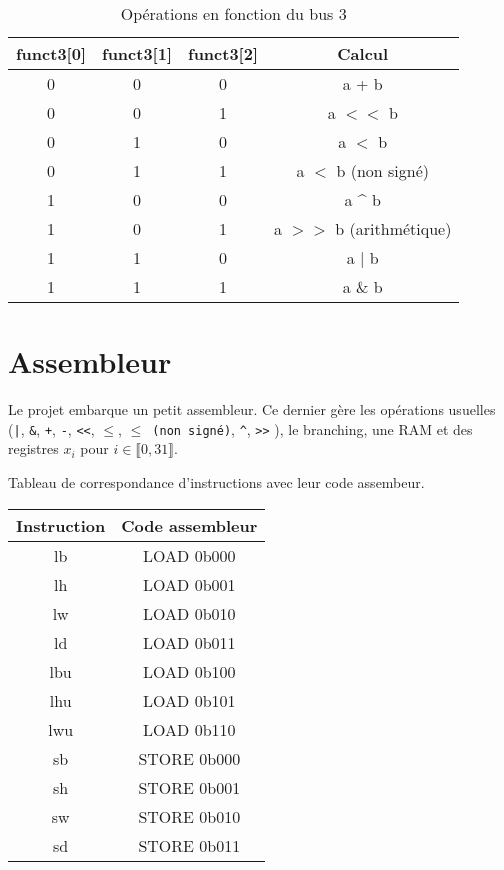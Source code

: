 \documentclass{article}
\begin{document}
\begin{table}[h!]
\centering
\begin{tabular}{|c|c|c|c|}
\hline
\textbf{funct3[0]} & \textbf{funct3[1]} & \textbf{funct3[2]} & \textbf{Calcul} \\
\hline
0 & 0 & 0 & a + b \\
0 & 0 & 1 & a $<<$ b \\
0 & 1 & 0 & a $<$ b \\
0 & 1 & 1 & a $<$ b (non signé) \\
1 & 0 & 0 & a \^{} b \\
1 & 0 & 1 & a $>>$ b (arithmétique) \\
1 & 1 & 0 & a $|$ b \\
1 & 1 & 1 & a \& b \\
\hline
\end{tabular}
\caption{Opérations en fonction du bus 3}
\end{table}



\newpage

\section{Assembleur}

Le projet embarque un petit assembleur. Ce dernier gère les opérations usuelles (\texttt{|}, \texttt{\&}, \texttt{+}, \texttt{-}, \texttt{<<}, \texttt{$\leq$}, \texttt{$\leq$ (non signé)}, \texttt{\^}, \texttt{>>} ), le branching, une RAM et des registres $x_i$ pour $ i \in \llbracket 0, 31 \rrbracket$. 

Tableau de correspondance d'instructions avec leur code assembeur. 

\begin{table}[h!]
\centering
\begin{tabular}{|c|c|}
\hline
\textbf{Instruction} & \textbf{Code assembleur} \\
\hline
lb   & LOAD 0b000 \\
lh   & LOAD 0b001 \\
lw   & LOAD 0b010 \\
ld   & LOAD 0b011 \\
lbu  & LOAD 0b100 \\
lhu  & LOAD 0b101 \\
lwu  & LOAD 0b110 \\
sb   & STORE 0b000 \\
sh   & STORE 0b001 \\
sw   & STORE 0b010 \\
sd   & STORE 0b011 \\
\hline
\end{tabular}
\end{table}
\end{document}
